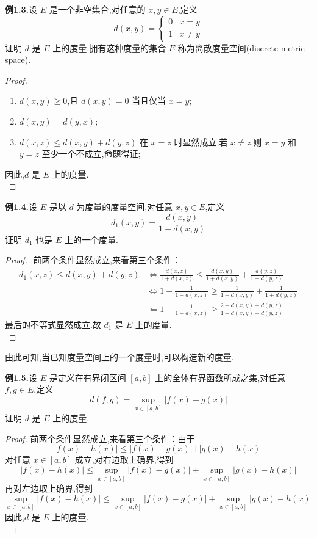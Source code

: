 \documentclass{article}
\begin{document}
\textbf{例1.3.}设 $E$ 是一个非空集合,对任意的 $x,y\in E$,定义
$$d(x,y) = \begin{cases} 0 & x=y \\ 1 & x\neq y \end{cases}$$
证明 $d$ 是 $E$ 上的度量.拥有这种度量的集合 $E$ 称为离散度量空间(discrete metric space).
\begin{proof}
    $ $
    \begin{enumerate}[label={\textbullet}]
        \item $d(x,y) \geq 0$,且 $d(x,y) = 0$ 当且仅当 $x=y$;
        \item $d(x,y) = d(y,x)$;
        \item $d(x,z)\leq d(x,y) + d(y,z)$ 在 $x=z$ 时显然成立;若 $x\neq z$,则 $x=y$ 和 $y=z$ 至少一个不成立,命题得证;
    \end{enumerate}
    因此,$d$ 是 $E$ 上的度量.\\
\end{proof}

\textbf{例1.4.}设 $E$ 是以 $d$ 为度量的度量空间,对任意 $x,y\in E$,定义
$$d_1(x,y) = \frac{d(x,y)}{1+d(x,y)}$$
证明 $d_1$ 也是 $E$ 上的一个度量.
\begin{proof}
    $ $
前两个条件显然成立,来看第三个条件：
\[\begin{aligned}
    d_1(x,z)\leq d(x, y)+d(y,z) 
& \Longleftrightarrow  \frac{d (x,z)}{1+d(x,z) }\leq \frac{d(x,y) }{1+d(x,y)}+\frac{d(y,z)}{1+d(y,z)} \\
& \Longleftrightarrow   1+\frac{1}{1+d(x,z)}\geq \frac{1}{1+d(x,y)}+\frac{1}{1+d (y,z)} \\
& \Longleftarrow 1+\frac{1}{1+d(x,z)}\geq \frac{2+d(x,y)+d (y,z) }{1+d(x, y)+d(y,z)}
\end{aligned}\]
最后的不等式显然成立.故 $d_1$ 是 $E$ 上的度量.\\
\end{proof}
由此可知,当已知度量空间上的一个度量时,可以构造新的度量.

\textbf{例1.5.}设 $E$ 是定义在有界闭区间 $[a,b]$ 上的全体有界函数所成之集,对任意 $f,g\in E$,定义
$$d(f,g) = \sup_{x\in [a,b]}|f(x)-g(x)|$$
证明 $d$ 是 $E$ 上的度量.
\begin{proof}
    前两个条件显然成立,来看第三个条件：由于
    $$\vert f(x) - h(x)\vert \leq \vert f(x) - g(x)\vert + \vert g(x) - h(x)\vert$$
    对任意 $x\in [a,b]$ 成立,对右边取上确界,得到
    $$\vert f(x) - h(x)\vert \leq \sup_{x\in [a,b]}|f(x)-g(x)| + \sup_{x\in [a,b]}|g(x)-h(x)|$$
    再对左边取上确界,得到
    $$\sup_{x\in [a,b]}|f(x)-h(x)| \leq \sup_{x\in [a,b]}|f(x)-g(x)| + \sup_{x\in [a,b]}|g(x)-h(x)|$$
    因此,$d$ 是 $E$ 上的度量.\\
\end{proof}
\end{document}
